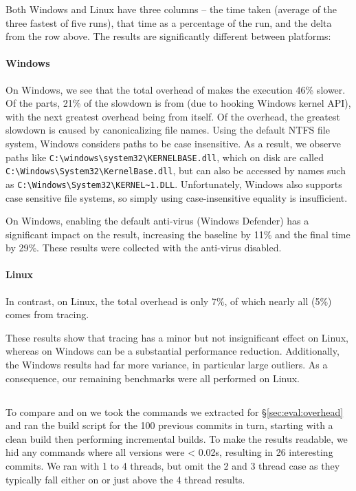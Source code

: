 Both Windows and Linux have three columns -- the time taken (average of the three fastest of five runs), that time as a percentage of the \Make run, and the delta from the row above. The results are significantly different between platforms:

\paragraph{Windows} On Windows, we see that the total overhead of \Rattle makes the execution 46\% slower. Of the parts, 21\% of the slowdown is from \Fsatrace (due to hooking Windows kernel API), with the next greatest overhead being from \Rattle itself. Of the \Rattle overhead, the greatest slowdown is caused by canonicalizing file names. Using the default NTFS file system, Windows considers paths to be case insensitive. As a result, we observe paths like \verb"C:\windows\system32\KERNELBASE.dll", which on disk are called \verb"C:\Windows\System32\KernelBase.dll", but can also be accessed by names such as \verb"C:\Windows\System32\KERNEL~1.DLL". Unfortunately, Windows also supports case sensitive file systems, so simply using case-insensitive equality is insufficient.

On Windows, enabling the default anti-virus (Windows Defender) has a significant impact on the result, increasing the \Make baseline by 11\% and the final time by 29\%. These results were collected with the anti-virus disabled.

\paragraph{Linux} In contrast, on Linux, the total overhead is only 7\%, of which nearly all (5\%) comes from tracing.

\postparagraphs

These results show that tracing has a minor but not insignificant effect on Linux, whereas on Windows can be a substantial performance reduction. Additionally, the Windows results had far more variance, in particular large outliers. As a consequence, our remaining benchmarks were all performed on Linux.

\subsection{\Fsatrace}
\label{sec:eval:fsatrace}

To compare \Make and \Rattle on \Fsatrace we took the commands we extracted for \S\ref{sec:eval:overhead} and ran the build script for the 100 previous commits in turn, starting with a clean build then performing incremental builds. To make the results readable, we hid any commands where all versions were < 0.02s, resulting in 26 interesting commits. We ran with 1 to 4 threads, but omit the 2 and 3 thread case as they typically fall either on or just above the 4 thread results.

